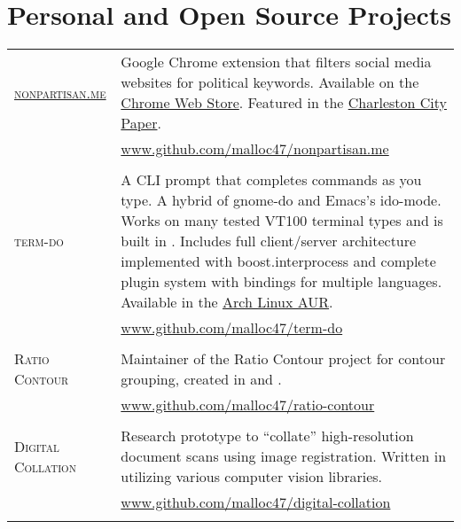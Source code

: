 \documentclass[10pt]{article}
\begin{document}
\newcommand{\proj}[3]{
  \textsc{#1} & \small{#2}\\
  \nopagebreak &\href{http://#3}{#3}\\
  \nopagebreak \multicolumn{2}{c}{} \\ [-1ex]
}
\section{Personal and Open Source Projects}
\begin{longtable}{l|p{12.3cm}}
  \proj{\href{http://nonpartisan.me}{nonpartisan.me}}%
{Google Chrome extension that filters social media websites for political keywords.  Available on the \href{https://chrome.google.com/webstore/detail/nonpartisanme/ninebcppidndhampaggnjbijpacoadgg}{Chrome Web Store}.  Featured in the \href{http://www.charlestoncitypaper.com/charleston/sick-of-politics-on-facebook-try-this-browser-tool/Content?oid=4153447}{Charleston City Paper}.}%
{www.github.com/malloc47/nonpartisan.me}

\proj{term-do}{A CLI prompt that completes commands as you type.  A hybrid of gnome-do and Emacs's ido-mode. Works on many tested VT100 terminal types and is built in \skill{C++}. Includes full client/server architecture implemented with boost.interprocess and complete plugin system with bindings for multiple languages. Available in the \href{https://aur.archlinux.org/packages/term-do-git/}{Arch Linux AUR}.}{www.github.com/malloc47/term-do}

  \proj{Ratio Contour}{Maintainer of the Ratio Contour project for contour grouping, created in \skill{C} and \skill{MATLAB}.}{www.github.com/malloc47/ratio-contour}

  \proj{Digital Collation}{Research prototype to ``collate'' high-resolution document scans using image registration.  Written in \skill{MATLAB} utilizing various computer vision libraries.}{www.github.com/malloc47/digital-collation}



\end{longtable}

\let\originalbibitem\bibitem
\def\bibitem#1#2\par{%
  \noexpandarg
  \originalbibitem{#1}
  \par}
\end{document}
